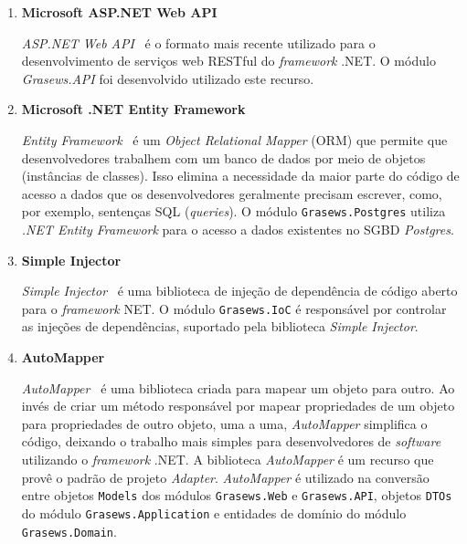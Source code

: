 \begin{enumerate}
  \item \textbf{Microsoft ASP.NET Web API}
  
  \textit{ASP.NET Web API}~\cite{MICROSOFT-2019-WEB-API} é o formato mais recente utilizado para o desenvolvimento de serviços web RESTful do \textit{framework} .NET. O módulo \textit{Grasews.API} foi desenvolvido utilizado este recurso.
  
  
  \item \textbf{Microsoft .NET Entity Framework}
  
  \textit{Entity Framework}~\cite{MICROSOFT-2019-Entity-Framework} é um \textit{Object Relational Mapper} (ORM) que permite que desenvolvedores trabalhem com um banco de dados por meio de objetos (instâncias de classes). Isso elimina a necessidade da maior parte do código de acesso a dados que os desenvolvedores geralmente precisam escrever, como, por exemplo, sentenças SQL (\textit{queries}). O módulo \texttt{Grasews.Postgres} utiliza \textit{.NET Entity Framework} para o acesso a dados existentes no SGBD \textit{Postgres}.
  
  
  \item \textbf{Simple Injector}
  
  \textit{Simple Injector}~\cite{SIMPLE-INJECTOR-2019} é uma biblioteca de injeção de dependência de código aberto para o \textit{framework} NET. O módulo \texttt{Grasews.IoC} é responsável por controlar as injeções de dependências, suportado pela biblioteca \textit{Simple Injector}.
  
  
  \item \textbf{AutoMapper}
  
  \textit{AutoMapper}~\cite{AUTO-MAPPER-2019} é uma biblioteca criada para mapear um objeto para outro. Ao invés de criar um método responsável por mapear propriedades de um objeto para propriedades de outro objeto, uma a uma, \textit{AutoMapper} simplifica o código, deixando o trabalho mais simples para desenvolvedores de \textit{software} utilizando o \textit{framework} .NET. A biblioteca \textit{AutoMapper} é um recurso que provê o padrão de projeto \textit{Adapter}. \textit{AutoMapper} é utilizado na conversão entre objetos \texttt{Models} dos módulos \texttt{Grasews.Web} e \texttt{Grasews.API}, objetos \texttt{DTOs} do módulo \texttt{Grasews.Application} e entidades de domínio do módulo \texttt{Grasews.Domain}.
  

\end{enumerate}
